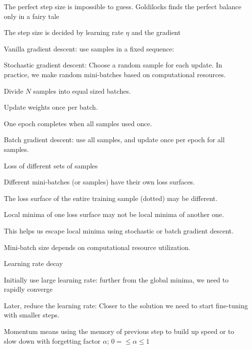 	\begin{bulletedlist}
		\item The perfect step size is impossible to guess. Goldilocks finds the perfect balance only in a fairy tale
		\item The step size is decided by learning rate $\eta$ and the gradient
	\end{bulletedlist}

	\begin{bulletedlist}
		\item Vanilla gradient descent: use samples in a fixed sequence: %
		\item Stochastic gradient descent: Choose a random sample for each update. In practice, we make random mini-batches based on computational resources.
		\begin{bulletedlist}
			\item Divide $N$ samples into equal sized batches.
			\item Update weights once per batch.
			\item One epoch completes when all samples used once.
		\end{bulletedlist}
		\item Batch gradient descent: use all samples, and update once per epoch for all samples.
	\end{bulletedlist}

	\begin{bulletedlist}
		\item Loss of different sets of samples
		\begin{bulletedlist}
			\item Different mini-batches (or samples) have their own loss surfaces.
			\item The loss surface of the entire training sample (dotted) may be different.
			\item Local minima of one loss surface may not be local minima of another one.
			\item This helps us escape local minima using stochastic or batch gradient descent.
			\item Mini-batch size depends on computational resource utilization.
		\end{bulletedlist}
		\item Learning rate decay
		\begin{bulletedlist}
			\item Initially use large learning rate: further from the global minima, we need to rapidly converge
			\item Later, reduce the learning rate: Closer to the solution we need to start fine-tuning with smaller steps.
		\end{bulletedlist}
		\item Momentum means using the memory of previous step to build up speed or to slow down with forgetting factor $\alpha$; $ 0 = \leq \alpha \leq 1 $
	\end{bulletedlist}


